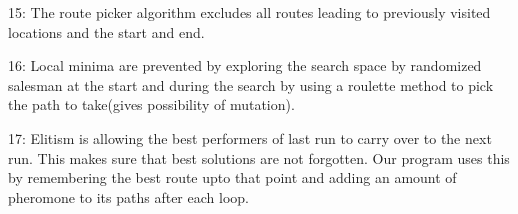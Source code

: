 \documentclass{article}
\begin{document}
15: The route picker algorithm excludes all routes leading to previously visited locations and the start and end.

16: Local minima are prevented by exploring the search space by randomized salesman at the start and during the search by using a roulette method to pick the path to take(gives possibility of mutation).

17: Elitism is allowing the best performers of last run to carry over to the next run. This makes sure that best solutions are not forgotten. Our program uses this by remembering the best route upto that point and adding an amount of pheromone to its paths after each loop.
\end{document}
